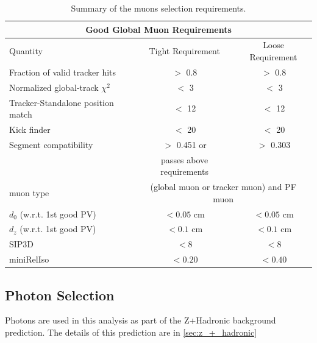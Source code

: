     \begin{table}[!h]
      \begin{center}
        \caption{\label{table:muons} Summary of the muons selection requirements.  }
        \begin{tabular}{l|c|c}
          \hline
          \hline
          \multicolumn{3}{c}{Good Global Muon Requirements} \\
          \hline
          Quantity   &  Tight Requirement & Loose Requirement \\
          \hline
          Fraction of valid tracker hits    & $>$ 0.8     & $>$ 0.8  \\ 
          Normalized global-track $\chi^2$  & $<$ 3       & $<$ 3    \\
          Tracker-Standalone position match & $<$ 12      & $<$ 12   \\
          Kick finder                       & $<$ 20      & $<$ 20   \\
          Segment compatibility             &$>$ 0.451 or & $>$ 0.303 \\
                                            &passes above requirements & \\
          \hline
          muon type & \multicolumn{2}{c}{(global muon or tracker muon) and PF muon} \\
          \hline
          $d_{0}$ (w.r.t. 1st good PV)   & $<0.05$ cm & $<0.05$ cm \\
          $d_{z}$ (w.r.t. 1st good PV)   & $<0.1$ cm  & $<0.1$ cm  \\
          SIP3D                          & $< 8$      & $< 8$      \\
          miniRelIso                     & $<0.20$ & $<0.40$       \\
          \hline
        \end{tabular}
      \end{center}
    \end{table}


\newpage

  \subsection{Photon Selection} \label{sec:photon_selection}

    Photons are used in this analysis as part of the Z+Hadronic background prediction. The details of this prediction are in \ref{sec:z_+_hadronic}

